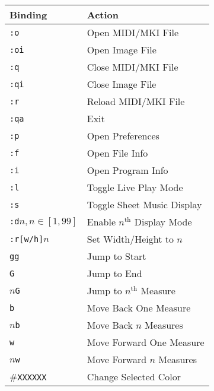 \documentclass[english]{article}
\makeatletter
\newenvironment{restoretext}%
    {\@parboxrestore%
     \begin{adjustwidth}{}{\leftmargin}%
    }{\end{adjustwidth}
     }
\def\rcbegin{\begin{restoretext}\centering}
\def\rcend{\end{restoretext}}
\providecommand{\mi}[1]{\texttt{#1}}
\makeatother
\begin{document}
\rcbegin
\begin{tabular}{|l|l|}
  \hline
  \textbf{Binding}                 												& \textbf{Action} \\
  \hline
  \mi{:o}       					 														    & Open MIDI/MKI File \\
  \mi{:oi} 					 														          & Open Image File \\
  \mi{:q}       					 														    & Close MIDI/MKI File \\
  \mi{:qi} 					 														          & Close Image File \\
  \mi{:r} 					 														          & Reload MIDI/MKI File \\
  \mi{:qa} 					 														          & Exit \\
  \mi{:p}       					 														    & Open Preferences \\
  \mi{:f}       					 														    & Open File Info \\
  \mi{:i}       					 														    & Open Program Info \\
  \mi{:l}   					 														        & Toggle Live Play Mode \\
  \mi{:s}   					 														        & Toggle Sheet Music Display \\
  \mi{:d}$n, n \in [1,99]$   														  & Enable $n^\text{th}$ Display Mode\\
  \mi{:r[w/h]}$n$               													& Set Width/Height to $n$ \\
  \mi{gg}   					 														        & Jump to Start \\
  \mi{G}   					 														          & Jump to End \\
  $n$\mi{G}       			                                  & Jump to $n^\text{th}$ Measure \\
  \mi{b}       			                                      & Move Back One Measure \\
  $n$\mi{b}       			                                  & Move Back $n$ Measures \\
  \mi{w}       			                                      & Move Forward One Measure \\
  $n$\mi{w}       			                                  & Move Forward $n$ Measures \\
  \#\mi{XXXXXX}       			 										  	        & Change Selected Color \\
  \hline
\end{tabular}
\rcend
\end{document}

